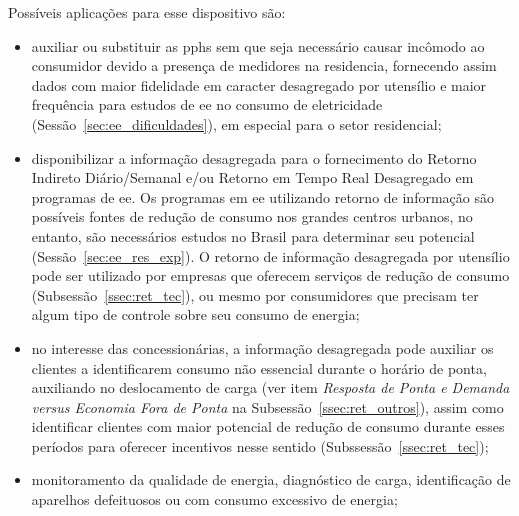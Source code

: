 Possíveis aplicações para esse dispositivo são: 

\begin{itemize}
\item auxiliar ou substituir as \glspl{pph} sem que seja necessário
causar incômodo ao consumidor devido a presença de medidores na
residencia, fornecendo assim dados com maior fidelidade em caracter
desagregado por utensílio e maior frequência para estudos de \gls{ee}
no consumo de eletricidade (Sessão~\ref{sec:ee_dificuldades}), em
especial para o setor residencial;
\item disponibilizar a informação desagregada para o fornecimento do
Retorno Indireto Diário/Semanal e/ou Retorno em Tempo Real Desagregado
em programas de \gls{ee}. Os programas em \gls{ee} utilizando retorno
de informação são possíveis fontes de redução de consumo nos grandes
centros urbanos, no entanto, são necessários estudos no Brasil para
determinar seu potencial (Sessão~\ref{sec:ee_res_exp}). O retorno de
informação desagregada por utensílio pode ser utilizado por empresas
que oferecem serviços de redução de consumo
(Subsessão~\ref{ssec:ret_tec}), ou mesmo por consumidores que precisam
ter algum tipo de controle sobre seu consumo de energia; \item no
interesse das concessionárias, a informação desagregada pode auxiliar
os clientes a identificarem consumo não essencial durante o horário de
ponta, auxiliando no deslocamento de carga (ver item \emph{Resposta de
Ponta e Demanda versus Economia Fora de Ponta} na
Subsessão~\ref{ssec:ret_outros}), assim como identificar clientes com
maior potencial de redução de consumo durante esses períodos para
oferecer incentivos nesse sentido (Subssessão~\ref{ssec:ret_tec}); 
\item monitoramento da qualidade de energia, diagnóstico de carga,
identificação de aparelhos defeituosos ou com consumo excessivo de
energia;
\end{itemize}

